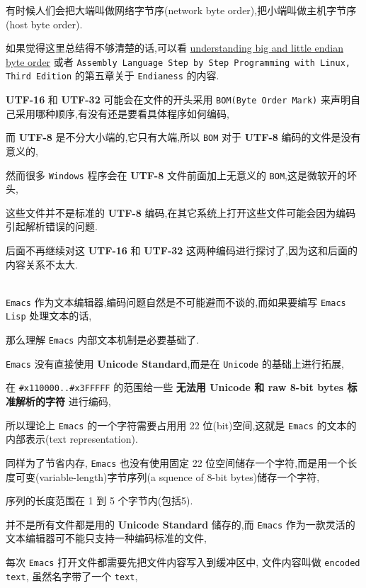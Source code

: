\documentclass[11pt]{article}
\begin{document}
有时候人们会把大端叫做网络字节序(network byte order),把小端叫做主机字节序(host byte order).

如果觉得这里总结得不够清楚的话,可以看 \href{https://www.digital-detective.net/understanding-big-and-little-endian-byte-order/}{understanding big and little endian byte order} 或者 \texttt{Assembly Language Step by Step Programming with Linux, Third Edition} 的第五章关于 \texttt{Endianess} 的内容.

\textbf{UTF-16} 和 \textbf{UTF-32} 可能会在文件的开头采用 \texttt{BOM(Byte Order Mark)} 来声明自己采用哪种顺序,有没有还是要看具体程序如何编码,

而 \textbf{UTF-8} 是不分大小端的,它只有大端,所以 \texttt{BOM} 对于 \textbf{UTF-8} 编码的文件是没有意义的,

然而很多 \texttt{Windows} 程序会在 \textbf{UTF-8} 文件前面加上无意义的 \texttt{BOM},这是微软开的坏头,

这些文件并不是标准的 \textbf{UTF-8} 编码,在其它系统上打开这些文件可能会因为编码引起解析错误的问题.

后面不再继续对这 \textbf{UTF-16} 和 \textbf{UTF-32} 这两种编码进行探讨了,因为这和后面的内容关系不太大.

\\[0pt]

\texttt{Emacs} 作为文本编辑器,编码问题自然是不可能避而不谈的,而如果要编写 \texttt{Emacs Lisp} 处理文本的话,

那么理解 \texttt{Emacs} 内部文本机制是必要基础了.

\texttt{Emacs} 没有直接使用 \textbf{Unicode Standard},而是在 \texttt{Unicode} 的基础上进行拓展,

在 \texttt{\#x110000..\#x3FFFFF} 的范围给一些 \textbf{无法用 Unicode 和 raw 8-bit bytes 标准解析的字符} 进行编码,

所以理论上 \texttt{Emacs} 的一个字符需要占用用 22 位(bit)空间,这就是 \texttt{Emacs} 的文本的内部表示(text representation).

同样为了节省内存, \texttt{Emacs} 也没有使用固定 22 位空间储存一个字符,而是用一个长度可变(variable-length)字节序列(a squence of 8-bit bytes)储存一个字符,

序列的长度范围在 1 到 5 个字节内(包括5).

并不是所有文件都是用的 \textbf{Unicode Standard} 储存的,而 \texttt{Emacs} 作为一款灵活的文本编辑器可不能只支持一种编码标准的文件,

每次 \texttt{Emacs} 打开文件都需要先把文件内容写入到缓冲区中, 文件内容叫做 \texttt{encoded text}, 虽然名字带了一个 \texttt{text},
\end{document}
